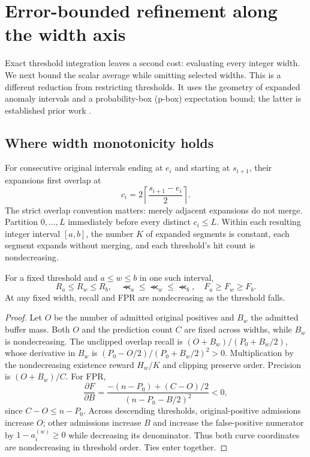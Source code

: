 \section{Error-bounded refinement along the width axis}
\label{sec:width}
Exact threshold integration leaves a second cost: evaluating every integer
width. We next bound the scalar average while omitting selected widths.
This is a different reduction from restricting thresholds. It uses the
geometry of expanded anomaly intervals and a probability-box (p-box)
expectation bound; the latter is established prior work
\cite{utkin2009,troffaes2011}.

\subsection{Where width monotonicity holds}
For consecutive original intervals ending at $e_i$ and starting at $s_{i+1}$,
their expansions first overlap at
\[
 c_i=2\left\lceil\frac{s_{i+1}-e_i}{2}\right\rceil .
\]
The strict overlap convention matters: merely adjacent expansions do not merge.
Partition $0,\ldots,L$ immediately before every distinct $c_i\le L$.
Within each resulting integer interval $[a,b]$, the number $K$ of expanded
segments is constant, each segment expands without merging, and each
threshold's hit count is nondecreasing.

\begin{lemma}
For a fixed threshold and $a\le w\le b$ in one such interval,
\[
 R_a\le R_w\le R_b,\quad
 \Prec_a\le\Prec_w\le\Prec_b,\quad
 F_a\ge F_w\ge F_b .
\]
At any fixed width, recall and FPR are nondecreasing as the threshold falls.
\end{lemma}
\begin{proof}
Let $O$ be the number of admitted original positives and $B_w$ the admitted
buffer mass. Both $O$ and the prediction count $C$ are fixed across widths,
while $B_w$ is nondecreasing. The unclipped overlap recall is
$(O+B_w)/(P_0+B_w/2)$, whose derivative in $B_w$ is
$(P_0-O/2)/(P_0+B_w/2)^2>0$. Multiplication by the nondecreasing
existence reward $H_w/K$ and clipping preserve order.
Precision is $(O+B_w)/C$. For FPR,
\[
 \frac{\partial F}{\partial B}
 =\frac{-(n-P_0)+(C-O)/2}{(n-P_0-B/2)^2}<0,
\]
since $C-O\le n-P_0$.
Across descending thresholds, original-positive admissions increase $O$;
other admissions increase $B$ and increase the false-positive numerator by
$1-a_i^{(w)}\ge0$ while decreasing its denominator. Thus both curve
coordinates are nondecreasing in threshold order. Ties enter together.
\end{proof}

